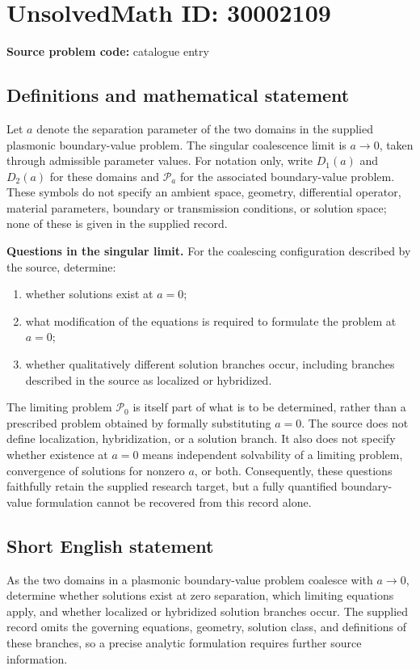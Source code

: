 \documentclass[11pt]{article}
\begin{document}
\section*{UnsolvedMath ID: 30002109}
\textbf{Source problem code:} catalogue entry
\subsection{Definitions and mathematical statement}
Let \(a\) denote the separation parameter of the two domains in the supplied plasmonic boundary-value problem. The singular coalescence limit is \(a\to0\), taken through admissible parameter values. For notation only, write \(D_1(a)\) and \(D_2(a)\) for these domains and \(\mathcal P_a\) for the associated boundary-value problem. These symbols do not specify an ambient space, geometry, differential operator, material parameters, boundary or transmission conditions, or solution space; none of these is given in the supplied record.

\textbf{Questions in the singular limit.} For the coalescing configuration described by the source, determine:
\begin{enumerate}
\item whether solutions exist at \(a=0\);
\item what modification of the equations is required to formulate the problem at \(a=0\);
\item whether qualitatively different solution branches occur, including branches described in the source as localized or hybridized.
\end{enumerate}
The limiting problem \(\mathcal P_0\) is itself part of what is to be determined, rather than a prescribed problem obtained by formally substituting \(a=0\). The source does not define localization, hybridization, or a solution branch. It also does not specify whether existence at \(a=0\) means independent solvability of a limiting problem, convergence of solutions for nonzero \(a\), or both. Consequently, these questions faithfully retain the supplied research target, but a fully quantified boundary-value formulation cannot be recovered from this record alone.
\subsection{Short English statement}
As the two domains in a plasmonic boundary-value problem coalesce with \(a\to0\), determine whether solutions exist at zero separation, which limiting equations apply, and whether localized or hybridized solution branches occur. The supplied record omits the governing equations, geometry, solution class, and definitions of these branches, so a precise analytic formulation requires further source information.
\end{document}

